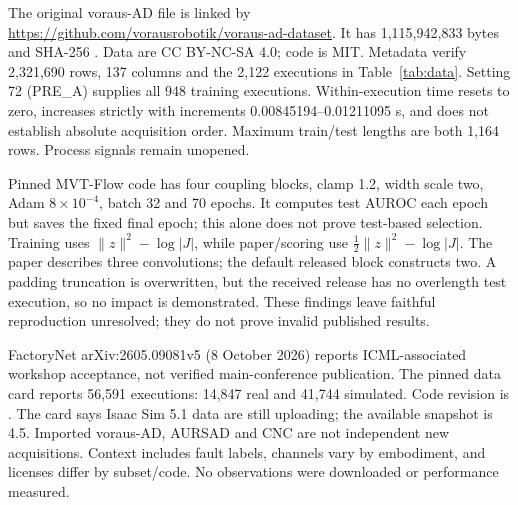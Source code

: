 The original voraus-AD file is linked by \url{https://github.com/vorausrobotik/voraus-ad-dataset}. It has 1,115,942,833 bytes and SHA-256 . Data are CC BY-NC-SA 4.0; code is MIT. Metadata verify 2,321,690 rows, 137 columns and the 2,122 executions in Table~\ref{tab:data}. Setting 72 (PRE\_A) supplies all 948 training executions. Within-execution time resets to zero, increases strictly with increments 0.00845194--0.01211095 s, and does not establish absolute acquisition order. Maximum train/test lengths are both 1,164 rows. Process signals remain unopened.

Pinned MVT-Flow code  has four coupling blocks, clamp 1.2, width scale two, Adam $8\times10^{-4}$, batch 32 and 70 epochs. It computes test AUROC each epoch but saves the fixed final epoch; this alone does not prove test-based selection. Training uses $\|z\|^2-\log|J|$, while paper/scoring use $\tfrac12\|z\|^2-\log|J|$. The paper describes three convolutions; the default released block constructs two. A padding truncation is overwritten, but the received release has no overlength test execution, so no impact is demonstrated. These findings leave faithful reproduction unresolved; they do not prove invalid published results.

FactoryNet arXiv:2605.09081v5 (8 October 2026) reports ICML-associated workshop acceptance, not verified main-conference publication. The pinned data card  reports 56,591 executions: 14,847 real and 41,744 simulated. Code revision is . The card says Isaac Sim 5.1 data are still uploading; the available snapshot is 4.5. Imported voraus-AD, AURSAD and CNC are not independent new acquisitions. Context includes fault labels, channels vary by embodiment, and licenses differ by subset/code. No observations were downloaded or performance measured.

